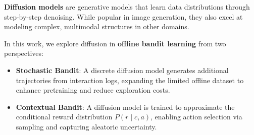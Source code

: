 \textbf{Diffusion models}\cite{campbell2022continuous} are generative models that learn data distributions through step-by-step denoising. While popular in image generation, they also excel at modeling complex, multimodal structures in other domains.



In this work, we explore diffusion in \textbf{offline bandit learning} from two perspectives:

\begin{itemize}
     \item \textbf{Stochastic Bandit}: A discrete diffusion model generates additional trajectories from interaction logs, expanding the limited offline dataset to enhance pretraining and reduce exploration costs.

    \item \textbf{Contextual Bandit}: A diffusion model is trained to approximate the conditional reward distribution \( P(r \mid c, a) \), enabling action selection via sampling and capturing aleatoric uncertainty.
\end{itemize}